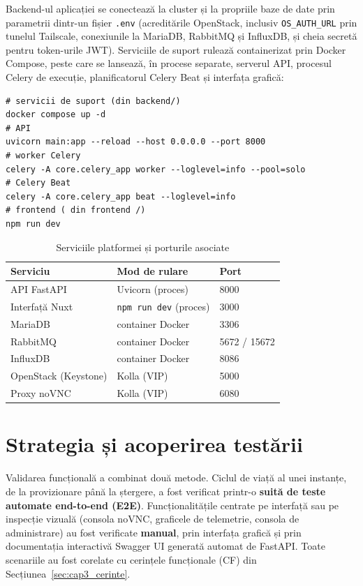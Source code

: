 Backend-ul aplicației se conectează la cluster și la propriile baze de date prin parametrii dintr-un fișier \texttt{.env} (acreditările OpenStack, inclusiv \texttt{OS\_AUTH\_URL} prin tunelul Tailscale, conexiunile la MariaDB, RabbitMQ și InfluxDB, și cheia secretă pentru token-urile JWT). Serviciile de suport rulează containerizat prin Docker Compose, peste care se lansează, în procese separate, serverul API, procesul Celery de execuție, planificatorul Celery Beat și interfața grafică:

\begin{lstlisting}[basicstyle=\ttfamily\footnotesize,breaklines=true,frame=single]
# servicii de suport (din backend/)
docker compose up -d
# API
uvicorn main:app --reload --host 0.0.0.0 --port 8000
# worker Celery
celery -A core.celery_app worker --loglevel=info --pool=solo
# Celery Beat
celery -A core.celery_app beat --loglevel=info
# frontend ( din frontend /)
npm run dev
\end{lstlisting}

\begin{table}[H]
    \centering
    \caption{Serviciile platformei și porturile asociate}
    \label{tab:cap4_porturi}
    \begin{tabular}{l l l}
        \hline
        \textbf{Serviciu} & \textbf{Mod de rulare} & \textbf{Port} \\
        \hline
        API FastAPI & Uvicorn (proces) & 8000 \\
        Interfață Nuxt & \texttt{npm run dev} (proces) & 3000 \\
        MariaDB & container Docker & 3306 \\
        RabbitMQ & container Docker & 5672 / 15672 \\
        InfluxDB & container Docker & 8086 \\
        OpenStack (Keystone) & Kolla (VIP) & 5000 \\
        Proxy noVNC & Kolla (VIP) & 6080 \\
        \hline
    \end{tabular}
\end{table}

\section{Strategia și acoperirea testării}
\label{sec:cap4_testare}

Validarea funcțională a combinat două metode. Ciclul de viață al unei instanțe, de la provizionare până la ștergere, a fost verificat printr-o \textbf{suită de teste automate end-to-end (E2E)}. Funcționalitățile centrate pe interfață sau pe inspecție vizuală (consola noVNC, graficele de telemetrie, consola de administrare) au fost verificate \textbf{manual}, prin interfața grafică și prin documentația interactivă Swagger UI generată automat de FastAPI. Toate scenariile au fost corelate cu cerințele funcționale (CF) din Secțiunea~\ref{sec:cap3_cerinte}.

